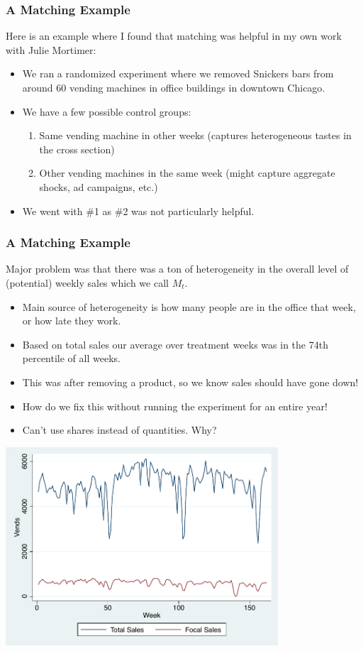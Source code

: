 \documentclass[xcolor=pdftex,dvipsnames,table,mathserif]{beamer}
\begin{document}
\begin{frame}
\frametitle{A Matching Example}
Here is an example where I found that matching was helpful in my own work with Julie Mortimer:
\begin{itemize}
\item We ran a randomized experiment where we removed Snickers bars from around 60 vending machines in office buildings in downtown Chicago.
\item We have a few possible control groups:
\begin{enumerate}
\item Same vending machine in other weeks (captures heterogeneous tastes in the cross section)
\item Other vending machines in the same week (might capture aggregate shocks, ad campaigns, etc.)
\end{enumerate}
\item We went with \#1 as \#2 was not particularly helpful.
\end{itemize}
\end{frame}

\begin{frame}
\frametitle{A Matching Example}
Major problem was that there was a ton of heterogeneity in the overall level of (potential) weekly sales which we call $M_t$.
\begin{itemize}
\item Main source of heterogeneity is how many people are in the office that week, or how late they work.
\item Based on total sales our average over treatment weeks was in the 74th percentile of all weeks.
\item This was after removing a product, so we know sales should have gone down!
\item How do we fix this without running the experiment for an entire year!
\item Can't use shares instead of quantities. Why?
\end{itemize}
\end{frame}

\begin{frame}
\begin{center}
\includegraphics[width=4in]{./resources/figure1.pdf}
\end{center}
\end{frame}
\end{document}
